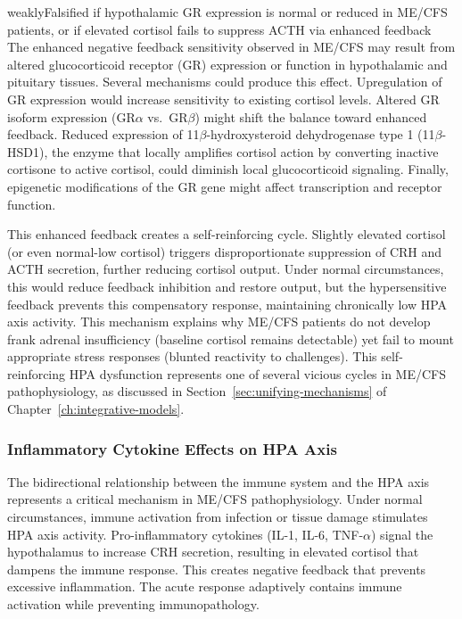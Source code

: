 \begin{fhypothesis}{weakly}{Falsified if hypothalamic GR expression is normal or reduced in ME/CFS patients, or if elevated cortisol fails to suppress ACTH via enhanced feedback}
\label{hyp:gcr-sensitivity}
The enhanced negative feedback sensitivity observed in ME/CFS may result from altered glucocorticoid receptor (GR) expression or function in hypothalamic and pituitary tissues. Several mechanisms could produce this effect. Upregulation of GR expression would increase sensitivity to existing cortisol levels. Altered GR isoform expression (GR$\alpha$ vs.\ GR$\beta$) might shift the balance toward enhanced feedback. Reduced expression of 11$\beta$-hydroxysteroid dehydrogenase type 1 (11$\beta$-HSD1), the enzyme that locally amplifies cortisol action by converting inactive cortisone to active cortisol, could diminish local glucocorticoid signaling. Finally, epigenetic modifications of the GR gene might affect transcription and receptor function.
\end{fhypothesis}

This enhanced feedback creates a self-reinforcing cycle. Slightly elevated cortisol (or even normal-low cortisol) triggers disproportionate suppression of CRH and ACTH secretion, further reducing cortisol output. Under normal circumstances, this would reduce feedback inhibition and restore output, but the hypersensitive feedback prevents this compensatory response, maintaining chronically low HPA axis activity. This mechanism explains why ME/CFS patients do not develop frank adrenal insufficiency (baseline cortisol remains detectable) yet fail to mount appropriate stress responses (blunted reactivity to challenges). This self-reinforcing HPA dysfunction represents one of several vicious cycles in ME/CFS pathophysiology, as discussed in Section~\ref{sec:unifying-mechanisms} of Chapter~\ref{ch:integrative-models}.

\subsubsection{Inflammatory Cytokine Effects on HPA Axis}

The bidirectional relationship between the immune system and the HPA axis represents a critical mechanism in ME/CFS pathophysiology. Under normal circumstances, immune activation from infection or tissue damage stimulates HPA axis activity. Pro-inflammatory cytokines (IL-1, IL-6, TNF-$\alpha$) signal the hypothalamus to increase CRH secretion, resulting in elevated cortisol that dampens the immune response. This creates negative feedback that prevents excessive inflammation. The acute response adaptively contains immune activation while preventing immunopathology.


